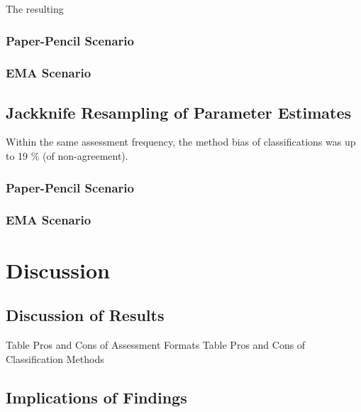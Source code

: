 \documentclass[12pt,twoside]{reedthesis}
\begin{document}
\par

The resulting

\hypertarget{paper-pencil-scenario-4}{%
\subsection{Paper-Pencil Scenario}\label{paper-pencil-scenario-4}}

\hypertarget{ema-scenario-4}{%
\subsection{EMA Scenario}\label{ema-scenario-4}}

\hypertarget{jackknife-resampling-of-parameter-estimates-1}{%
\section{Jackknife Resampling of Parameter Estimates}\label{jackknife-resampling-of-parameter-estimates-1}}

Within the same assessment frequency, the method bias of classifications was up to 19 \% (of non-agreement).

\hypertarget{paper-pencil-scenario-5}{%
\subsection{Paper-Pencil Scenario}\label{paper-pencil-scenario-5}}

\hypertarget{ema-scenario-5}{%
\subsection{EMA Scenario}\label{ema-scenario-5}}

\hypertarget{discussion}{%
\chapter{Discussion}\label{discussion}}

\hypertarget{discussion-of-results}{%
\section{Discussion of Results}\label{discussion-of-results}}

Table Pros and Cons of Assessment Formats
Table Pros and Cons of Classification Methods

\hypertarget{implications-of-findings}{%
\section{Implications of Findings}\label{implications-of-findings}}
\end{document}
